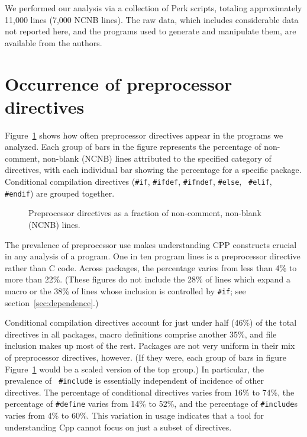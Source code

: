 \documentclass[10pt]{article}
\begin{document}
We performed our analysis via a collection of Perk scripts, totaling
approximately 11,000 lines (7,000 NCNB lines).  The raw data, which
includes considerable data not reported here, and the programs used to
generate and manipulate them, are available from the authors.







\section{Occurrence of preprocessor directives}
\label{sec:directives}
\label{sec:first-content-section}

Figure~\ref{fig:directives-breakdown} shows how often preprocessor
directives appear in the programs we analyzed.  Each group of bars in the
figure represents the percentage of non-comment, non-blank (NCNB) lines
attributed to the specified category of directives, with each individual
bar showing the percentage for a specific package.  Conditional compilation
directives ({\tt \#if}, {\tt \#ifdef}, {\tt \#ifndef}, {\tt \#else}, {\tt
\#elif}, {\tt \#endif}) are grouped together.

\begin{figure}
\centerline{}
\caption{Preprocessor directives as a fraction of non-comment,
  non-blank (NCNB) lines.}
\label{fig:directives-breakdown}
\end{figure}

The prevalence of preprocessor use makes understanding CPP constructs
crucial in any analysis of a program.  One in ten program lines is a
preprocessor directive rather than C code.  Across
packages, the percentage varies from less than 4\% to more than 22\%.
(These figures do not include the 28\% of lines which expand a macro or the
38\% of lines whose inclusion is controlled by {\tt \#if}; see
section~\ref{sec:dependence}.)


Conditional compilation directives account for just under half (46\%) of
the total directives in all packages, macro definitions comprise another
35\%, and file inclusion makes up most of the rest.  Packages are not very
uniform in their mix of preprocessor directives, however.  (If they were,
each group of bars in figure Figure~\ref{fig:directives-breakdown} would be
a scaled version of the top group.)  In particular, the prevalence of {\tt
\#include} is essentially independent of incidence of other directives.
The percentage of conditional directives varies from 16\% to 74\%, the
percentage of {\tt \#define} varies from 14\% to 52\%, and the percentage
of {\tt \#include}s varies from 4\% to 60\%.  This variation in usage
indicates that a tool for understanding Cpp cannot focus on just a subset
of directives.  
\end{document}
